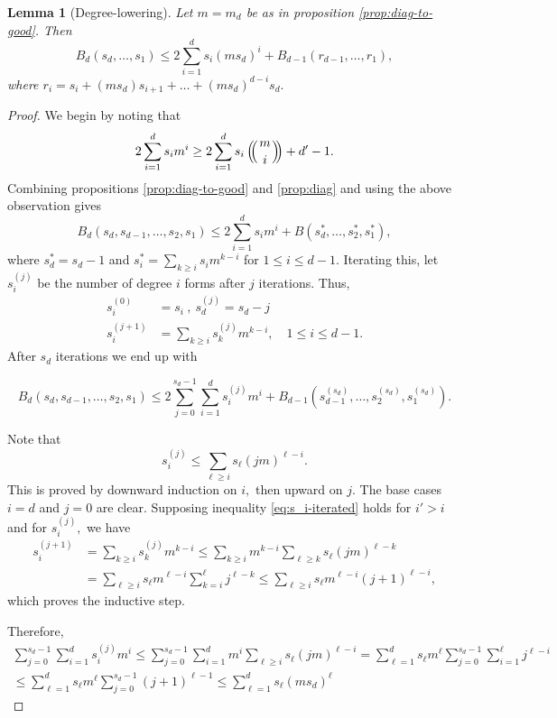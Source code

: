 \documentclass[10pt,a4paper]{amsart}
\newtheorem{lemma}[theorem]{Lemma}
\theoremstyle{definition}
\def\multiset#1#2{\ensuremath{\left(\kern-.3em\left(\genfrac{}{}{0pt}{}{#1}{#2}\right)\kern-.3em\right)}}
\begin{document}
\begin{lemma}[Degree-lowering]\label{lem:deg-lower}
    Let $m = m_d$ be as in proposition \ref{prop:diag-to-good}. Then 
    \[
    B_d(s_d,\ldots,s_1) \le 
    2 \sum_{i=1}^{d} s_i (ms_d)^i  +  B_{d-1}(r_{d-1},\ldots,r_1),
    \]
    where $r_i = s_i + (ms_d)s_{i+1}+\ldots+(ms_d)^{d-i} s_d.$
\end{lemma}

\begin{proof}

We begin by noting that 
    \[
    2\sum_{i=1}^d s_i m^i \ge 2\sum_{i=1}^d s_i\multiset{m}{i} + d'-1.
    \]
Combining propositions \ref{prop:diag-to-good} and \ref{prop:diag} and using the above observation gives
\[
    B_d(s_d,s_{d-1},\ldots,s_2,s_1) \le  2\sum_{i=1}^d s_im^i+B(s^*_d,\ldots,s^*_2,s^*_1),
    \]
    where $s^*_d = s_d-1$ and $s^*_i = \sum_{k\ge i} s_im^{k-i}$ for $1\le i\le d-1.$ Iterating this, let $s_i^{(j)}$ be the number of degree $i$ forms after $j$ iterations. Thus, 
    \begin{align*}
         s_i^{(0)} &= s_i\ ,\ s_d^{(j)} = s_d-j \\ s_i^{(j+1)} &= \sum_{k\ge i} s_k^{(j)} m^{k-i}, \quad 1\le i\le d-1.
    \end{align*}
    After $s_d$ iterations we end up with
    
\begin{equation}\label{eq:main-prop-iterated}
     B_d(s_d,s_{d-1},\ldots,s_2,s_1) \le 2\sum_{j=0}^{s_d-1}\sum_{i=1}^d s_i^{(j)}m^i + B_{d-1}(s_{d-1}^{(s_d)},\ldots,s_2^{(s_d)},s_1^{(s_d)}).
\end{equation}

Note that
\begin{equation}\label{eq:s_i-iterated}
    s_i^{(j)} \le \sum_{\ell \ge i} s_\ell(jm)^{\ell-i}.
\end{equation}
This is proved by downward induction on $i,$ then upward on $j.$ The base cases $i =d$ and $j = 0$ are clear. Supposing inequality \eqref{eq:s_i-iterated} holds for $i' >i$ and for $s_i^{(j)},$ we have 
\begin{align*}
    s_i^{(j+1)} &= \sum_{k\ge i} s_k^{(j)} m^{k-i} \le \sum_{k\ge i} m^{k-i} \sum_{\ell \ge k} s_\ell(jm)^{\ell-k} \\
    &= \sum_{\ell \ge i} s_\ell m^{\ell-i} \sum_{k=i}^\ell  j^{\ell-k} \le \sum_{\ell \ge i} s_\ell m^{\ell-i} (j+1)^{\ell-i},
\end{align*}
which proves the inductive step.

Therefore,
\begin{multline}\label{eq:s_i-sum-iterated}
        \sum_{j=0}^{s_d-1}\sum_{i=1}^d s_i^{(j)}m^i \le \sum_{j=0}^{s_d-1}\sum_{i=1}^d m^i \sum_{\ell \ge i} s_\ell(jm)^{\ell-i}  = \sum_{\ell = 1}^d s_\ell m^\ell \sum_{j=0}^{s_d-1} \sum_{i=1}^\ell j^{\ell-i}\\
        \le \sum_{\ell = 1}^d s_\ell m^\ell \sum_{j=0}^{s_d-1}  (j+1)^{\ell-1} \le \sum_{\ell = 1}^d s_\ell (ms_d)^\ell 
\end{multline} 


\end{proof}
\end{document}
